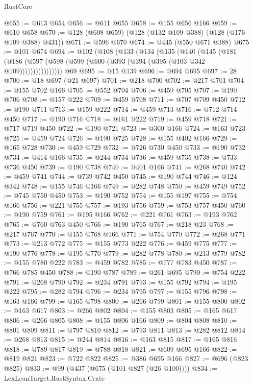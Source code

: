 \begin{lexlean}{RustCore}
\begin{coremodule}
@655 := @613 @654
@656 := @611 @655
@658 := @155 @656 @166
@659 := @610 @658
@670 := @128 (@608 @659) (@128 (@132 @109 @388) (@128 (@176 @109 @388) @431))
@671 := @596 @670
@674 := @445 (@550 @671 @388)
@675 := @101 @674
@694 := @102
    (@108
      (@133
        (@134
          (@135
            (@140
              (@145
                (@181
                  (@186 (@597 (@598 (@599 (@600 (@393 (@394 (@395 (@103 @342 @109))))))))))))))))
    @69
@695 := @15 @139
@696 := @694 @695
@697 := 28
@700 := @18 @697 (@21 @697)
@701 := @218 @700
@702 := @217 @701
@704 := @155 @702 @166
@705 := @552 @704
@706 := @459 @705
@707 := @190 @706
@708 := @157 @222
@709 := @459 @708
@711 := @707 @709 @450
@712 := @190 @711
@713 := @159 @222
@714 := @459 @713
@716 := @712 @714 @450
@717 := @190 @716
@718 := @161 @222
@719 := @459 @718
@721 := @717 @719 @450
@722 := @190 @721
@723 := @300 @166
@724 := @163 @723
@725 := @459 @724
@726 := @190 @725
@728 := @155 @402 @166
@729 := @165 @728
@730 := @459 @729
@732 := @726 @730 @450
@733 := @190 @732
@734 := @414 @166
@735 := @244 @734
@736 := @459 @735
@738 := @733 @736 @450
@739 := @190 @738
@740 := @401 @166
@741 := @268 @740
@742 := @459 @741
@744 := @739 @742 @450
@745 := @190 @744
@746 := @124 @342
@748 := @155 @746 @166
@749 := @282 @748
@750 := @459 @749
@752 := @745 @750 @450
@753 := @190 @752
@754 := @155 @197
@755 := @754 @166
@756 := @221 @755
@757 := @193 @756
@759 := @753 @757 @450
@760 := @190 @759
@761 := @195 @166
@762 := @221 @761
@763 := @193 @762
@765 := @760 @763 @450
@766 := @190 @765
@767 := @218 @23
@768 := @217 @767
@770 := @155 @768 @166
@771 := @754 @770
@772 := @268 @771
@773 := @213 @772
@775 := @155 @773 @222
@776 := @459 @775
@777 := @190 @776
@778 := @195 @770
@779 := @282 @778
@780 := @213 @779
@782 := @155 @780 @222
@783 := @459 @782
@785 := @777 @783 @450
@787 := @766 @785 @450
@788 := @190 @787
@789 := @261 @695
@790 := @754 @222
@791 := @268 @790
@792 := @234 @791
@793 := @155 @792
@794 := @195 @222
@795 := @282 @794
@796 := @234 @795
@797 := @155 @796
@798 := @163 @166
@799 := @165 @798
@800 := @266 @799
@801 := @155 @800
@802 := @163 @617
@803 := @266 @802
@804 := @155 @803
@805 := @165 @617
@806 := @266 @805
@808 := @155 @806 @166
@809 := @804 @808
@810 := @801 @809
@811 := @797 @810
@812 := @793 @811
@813 := @282 @812
@814 := @268 @813
@815 := @244 @814
@816 := @163 @815
@817 := @165 @816
@818 := @789 @817
@819 := @788 @818
@821 := @609 @695 @166
@822 := @819 @821
@823 := @722 @822
@825 := @386 @695 @166
@827 := @696 (@823 @825)
@833 := @99 (@437 (@675 (@101 @827 (@26 @100))))
@834 := LexLeanTarget.RustSyntax.Crate

\end{coremodule}
\end{lexlean}
